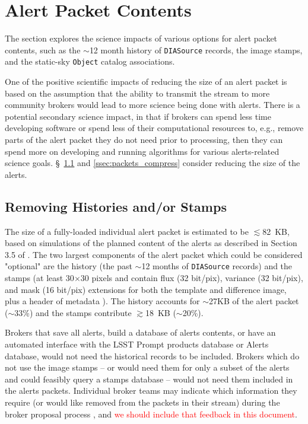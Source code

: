 \documentclass[DM,lsstdraft,authoryear,toc]{lsstdoc}
\begin{document}



\clearpage
\section{Alert Packet Contents} \label{sec:packets}

The section explores the science impacts of various options for alert packet contents, such as the $\sim$12 month history of {\tt DIASource} records, the image stamps, and the static-sky {\tt Object} catalog associations.

One of the positive scientific impacts of reducing the size of an alert packet is based on the assumption that the ability to transmit the stream to more community brokers would lead to more science being done with alerts. There is a potential secondary science impact, in that if brokers can spend less time developing software or spend less of their computational resources to, e.g., remove parts of the alert packet they do not need prior to processing, then they can spend more on developing and running algorithms for various alerts-related science goals. \S~\ref{ssec:packets_remove} and \ref{ssec:packets_compress} consider reducing the size of the alerts.


\subsection{Removing Histories and/or Stamps}\label{ssec:packets_remove}

The size of a fully-loaded individual alert packet is estimated to be $\lesssim$82~KB, based on simulations of the planned content of the alerts as described in Section 3.5 of . The two largest components of the alert packet which could be considered "optional" are the history (the past $\sim$12 months of {\tt DIASource} records) and the stamps (at least 30$\times$30 pixels and contain flux (32 bit/pix), variance (32 bit/pix), and mask (16 bit/pix) extensions for both the template and difference image, plus a header of metadata ). The history accounts for $\sim$27KB of the alert packet ($\sim$33\%) and the stamps contribute $\gtrsim$18~KB ($\sim$20\%). 

Brokers that save all alerts, build a database of alerts contents, or have an automated interface with the LSST Prompt products database or Alerts database, would not need the historical records to be included. Brokers which do not use the image stamps -- or would need them for only a subset of the alerts and could feasibly query a stamps database -- would not need them included in the alerts packets. Individual broker teams may indicate which information they require (or would like removed from the packets in their stream) during the broker proposal process , and \textcolor{red}{we should include that feedback in this document}.
\end{document}
